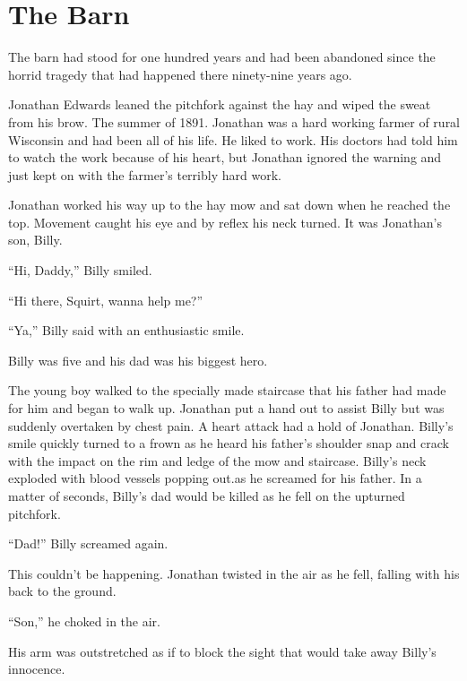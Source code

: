 \chapter{The Barn}

The barn had stood for one hundred years and had been abandoned since
the horrid tragedy that had happened there ninety-nine years ago.

Jonathan Edwards leaned the pitchfork against the hay and wiped the
sweat from his brow. The summer of 1891. Jonathan was a hard working
farmer of rural Wisconsin and had been all of his life. He liked to
work. His doctors had told him to watch the work because of his heart,
but Jonathan ignored the warning and just kept on with the farmer's
terribly hard work.

Jonathan worked his way up to the hay mow and sat down when he reached
the top. Movement caught his eye and by reflex his neck turned. It was
Jonathan's son, Billy.

``Hi, Daddy,'' Billy smiled.

``Hi there, Squirt, wanna help me?''

``Ya,'' Billy said with an enthusiastic smile.

Billy was five and his dad was his biggest hero.

The young boy walked to the specially made staircase that his father had
made for him and began to walk up. Jonathan put a hand out to assist
Billy but was suddenly overtaken by chest pain. A heart attack had a
hold of Jonathan. Billy's smile quickly turned to a frown as he heard
his father's shoulder snap and crack with the impact on the rim and
ledge of the mow and staircase. Billy's neck exploded with blood vessels
popping out.as he screamed for his father. In a matter of seconds,
Billy's dad would be killed as he fell on the upturned pitchfork.

``Dad!'' Billy screamed again.

This couldn't be happening. Jonathan twisted in the air as he fell,
falling with his back to the ground.

``Son,'' he choked in the air.

His arm was outstretched as if to block the sight that would take away
Billy's innocence.

